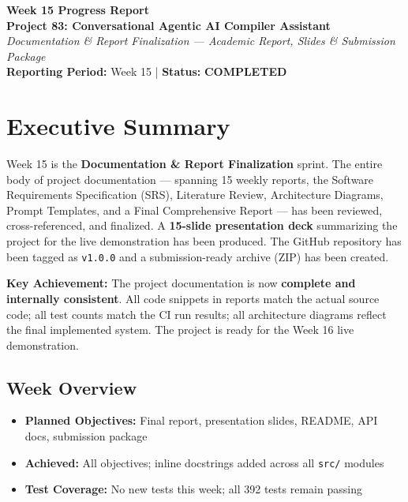 \documentclass[a4paper,11pt]{article}
\newcommand{\statusgood}[1]{\colorbox{green!20}{\textbf{#1}}}
\begin{document}
\begin{center}
    {\huge \textbf{Week 15 Progress Report}} \\
    \vspace{3mm}
    {\large \textbf{Project 83: Conversational Agentic AI Compiler Assistant}} \\
    \vspace{2mm}
    \textit{Documentation \& Report Finalization --- Academic Report, Slides \& Submission Package} \\
    \vspace{2mm}
    \textbf{Reporting Period:} Week 15 | \textbf{Status:} \statusgood{COMPLETED}
\end{center}

\vspace{5mm}

\section{Executive Summary}

Week 15 is the \textbf{Documentation \& Report Finalization} sprint. The entire body of project documentation --- spanning 15 weekly reports, the Software Requirements Specification (SRS), Literature Review, Architecture Diagrams, Prompt Templates, and a Final Comprehensive Report --- has been reviewed, cross-referenced, and finalized. A \textbf{15-slide presentation deck} summarizing the project for the live demonstration has been produced. The GitHub repository has been tagged as \texttt{v1.0.0} and a submission-ready archive (ZIP) has been created.

\textbf{Key Achievement:} The project documentation is now \textbf{complete and internally consistent}. All code snippets in reports match the actual source code; all test counts match the CI run results; all architecture diagrams reflect the final implemented system. The project is ready for the Week 16 live demonstration.

\subsection{Week Overview}
\begin{itemize}[leftmargin=*]
    \item \textbf{Planned Objectives:} Final report, presentation slides, README, API docs, submission package
    \item \textbf{Achieved:} All objectives; inline docstrings added across all \texttt{src/} modules
    \item \textbf{Test Coverage:} No new tests this week; all 392 tests remain passing
\end{itemize}
\end{document}
